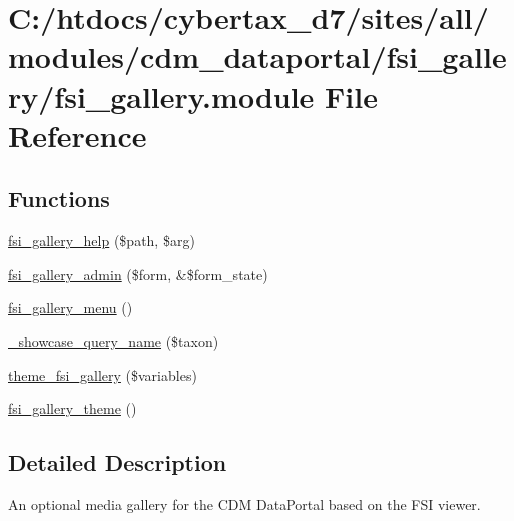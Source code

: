 \hypertarget{fsi__gallery_8module}{\section{C\-:/htdocs/cybertax\-\_\-d7/sites/all/modules/cdm\-\_\-dataportal/fsi\-\_\-gallery/fsi\-\_\-gallery.module File Reference}
\label{fsi__gallery_8module}
}
\subsection*{Functions}
\begin{DoxyCompactItemize}
\item 
\hyperlink{fsi__gallery_8module_ae1a4e58572ca1e45ffeb8c40141d1dd0}{fsi\-\_\-gallery\-\_\-help} (\$path, \$arg)
\item 
\hyperlink{fsi__gallery_8module_ab76efd9eefaa09210c64a19670218fd3}{fsi\-\_\-gallery\-\_\-admin} (\$form, \&\$form\-\_\-state)
\item 
\hyperlink{fsi__gallery_8module_ad62322856fbeb710159cc7481487cef2}{fsi\-\_\-gallery\-\_\-menu} ()
\item 
\hyperlink{fsi__gallery_8module_afbe781b4045905b65432e9900e1c212a}{\-\_\-showcase\-\_\-query\-\_\-name} (\$taxon)
\item 
\hyperlink{fsi__gallery_8module_a22de70c14f447ff5ff894a8603340a34}{theme\-\_\-fsi\-\_\-gallery} (\$variables)
\item 
\hyperlink{fsi__gallery_8module_a6104c012dd1330816d99c056b8277da9}{fsi\-\_\-gallery\-\_\-theme} ()
\end{DoxyCompactItemize}


\subsection{Detailed Description}
An optional media gallery for the C\-D\-M Data\-Portal based on the F\-S\-I viewer.

